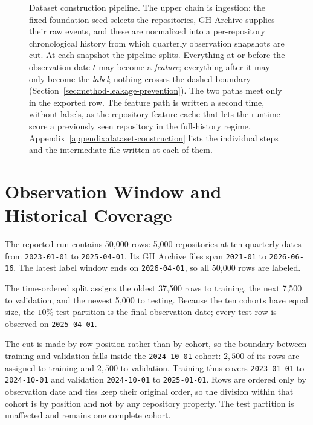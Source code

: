 \begin{figure}[htbp]
\caption[Dataset construction pipeline and its leakage boundary]{Dataset
construction pipeline. The upper chain is ingestion: the fixed foundation seed
selects the repositories, GH Archive supplies their raw events, and these are
normalized into a per-repository chronological history from which quarterly
observation snapshots are cut. At each snapshot the pipeline splits. Everything at
or before the observation date \(t\) may become a \emph{feature}; everything after
it may only become the \emph{label}; nothing crosses the dashed boundary
(Section~\ref{sec:method-leakage-prevention}). The two paths meet only in the
exported row. The feature path is written a second time, without labels, as the
repository feature cache that lets the runtime score a previously seen repository
in the full-history regime. Appendix~\ref{appendix:dataset-construction} lists the
individual steps and the intermediate file written at each of them.}
\label{fig:dataset-pipeline}
\end{figure}

\section{Observation Window and Historical Coverage}
\label{sec:method-observation-window}

The reported run contains 50,000 rows: 5,000 repositories at ten quarterly dates
from \texttt{2023-01-01} to \texttt{2025-04-01}. Its GH Archive files span
\texttt{2021-01} to \texttt{2026-06-16}. The latest label window ends on
\texttt{2026-04-01}, so all 50,000 rows are labeled.

The time-ordered split assigns the oldest 37,500 rows to training, the next 7,500
to validation, and the newest 5,000 to testing. Because the ten cohorts have
equal size, the \(10\%\) test partition is the final observation date; every test
row is observed on \texttt{2025-04-01}.

The cut is made by row position rather than by cohort, so the boundary between
training and validation falls inside the \texttt{2024-10-01} cohort: \(2{,}500\)
of its rows are assigned to training and \(2{,}500\) to validation. Training thus
covers \texttt{2023-01-01} to \texttt{2024-10-01} and validation
\texttt{2024-10-01} to \texttt{2025-01-01}. Rows are ordered only by observation
date and ties keep their original order, so the division within that cohort is by
position and not by any repository property. The test partition is unaffected and
remains one complete cohort.


